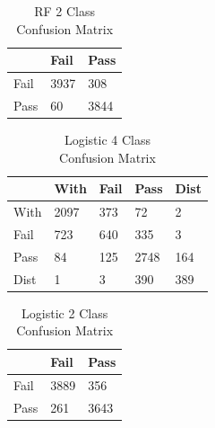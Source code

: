 \documentclass[11pt, a4paper]{article}
\begin{document}
\begin{multicols}{3}
	\begin{table}[H]
		\centering
		\captionsetup{justification=centering,margin=1cm}
		\begin{tabular}{|l|l|l|}
			\hline
				 &	Fail  & Pass \\ \hline
			Fail &  3937  & 308  \\ \hline
			Pass &    60  & 3844 \\ \hline
			\end{tabular}
		\centering
		\caption{RF 2 Class \\Confusion Matrix}
		\label{table:RF2Confusion}
	\end{table}

	\begin{table}[H]
		\centering
		\captionsetup{justification=centering,margin=1cm}
		\begin{tabular}{|l|l|l|l|l|}
			\hline
							&	With 	&  Fail & Pass  & Dist \\ \hline
			With      &  	2097 		&  373  &   72  &         2 \\ \hline
			Fail           &   723 		&  640  &  335  &         3 \\ \hline
			Pass        &     84  		&  125  & 2748  &        164 \\ \hline
			Dist     &     1 		&   3   & 390  &       389 \\ \hline
			\end{tabular}
		\centering
		\caption{Logistic 4 Class \\Confusion Matrix}
		\label{table:Log4Confusion}
	\end{table}

	\vspace{2.2cm}

	\begin{table}[H]
		\centering
		\captionsetup{justification=centering,margin=1cm}
		\begin{tabular}{|l|l|l|}
			\hline
				 &	Fail  & Pass \\ \hline
			Fail &  3889  & 356  \\ \hline
			Pass &   261  & 3643 \\ \hline
			\end{tabular}
		\centering
		\caption{Logistic 2 Class \\Confusion Matrix}
		\label{table:Log2Confusion}
	\end{table}
\end{multicols}

		

	
\end{document}

